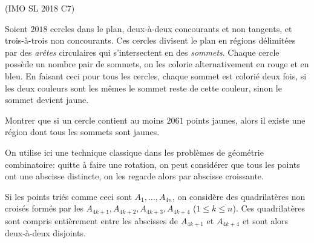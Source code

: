 \begin{exo}
(IMO SL 2018 C7)

Soient $2018$ cercles dans le plan, deux-à-deux concourants et non tangents, et trois-à-trois non concourants. Ces cercles divisent le plan en régions délimitées par des \textit{arêtes} circulaires qui s'intersectent en des \textit{sommets}. Chaque cercle possède un nombre pair de sommets, on les colorie alternativement en rouge et en bleu. En faisant ceci pour tous les cercles, chaque sommet est colorié deux fois, si les deux couleurs sont les mêmes le sommet reste de cette couleur, sinon le sommet devient jaune.

Montrer que si un cercle contient au moins $2061$ points jaunes, alors il existe une région dont tous les sommets sont jaunes.
\end{exo}


\begin{sol}
On utilise ici une technique classique dans les problèmes de géométrie combinatoire: quitte à faire une rotation, on peut considérer que tous les points ont une abscisse distincte, on les regarde alors par abscisse croissante.

Si les points triés comme ceci sont $A_1,\ldots,A_{4n}$, on considère des quadrilatères non croisés formés par les $A_{4k+1},A_{4k+2},A_{4k+3},A_{4k+4}$ ($1\le k\le n$). Ces quadrilatères sont compris entièrement entre les abscisses de $A_{4k+1}$ et $A_{4k+4}$ et sont alors deux-à-deux disjoints.
\end{sol}


